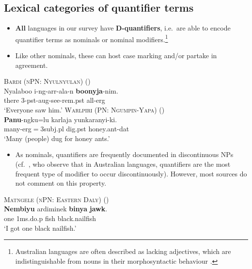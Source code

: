 \documentclass{article}
\begin{document}
\subsection{Lexical categories of quantifier terms}
\begin{itemize}
\item \textbf{All} languages in our survey have \textbf{D-quantifiers}, i.e.\ are able to encode quantifier terms as nominals or nominal modifiers.\footnote{Australian languages are often described as lacking adjectives, which are indistinguishable from nouns in their morphosyntactic behaviour \citep[e.g.,][102]{mcgregor04}.}
\item Like other nominals, these can host case marking and/or partake in agreement.
\end{itemize}

\begin{exe}
  \ex\label{allerg} \textsc{Bardi (nPN: Nyulnyulan)} (\citealt[272]{bowern12})\\
  \gll Nyalaboo i-ng-arr-ala-n \textbf{boonyja}-nim.\\
  there 3-{\sc pst}-{\sc aug}-see-{\sc rem.pst} all-{\sc erg}\\
  \glt `Everyone saw him.'
  \ex \textsc{Warlpiri (PN: Ngumpin-Yapa)} (\citealt[6]{bowler17})\\
  \gll \textbf{Panu}-ngku=lu karlaja yunkaranyi-ki.\\
  many-{\sc erg}$=${\sc 3subj.pl} dig.{\sc pst} honey.ant-{\sc dat}\\
  \glt `Many (people) dug for honey ants.'
\end{exe}

\begin{itemize}
\item As nominals, quantifiers are frequently documented in discontinuous NPs (cf.\ \citealt[51--52]{louagieverstraete16}, who observe that in Australian languages, quantifiers are the most frequent type of modifier to occur discontinuously). However, most sources do not comment on this property.
\end{itemize}

\begin{exe}
  \ex \textsc{Matngele (nPN: Eastern Daly)} (\citealt[54]{zandvoort99})\\
  \gll \textbf{Nembiyu} ardiminek \textbf{binya} \textbf{jawk}.\\
  one 1{\sc ms.}do.{\sc p} fish black.nailfish\\
  \glt `I got one black nailfish.' %
\end{exe}
\end{document}
